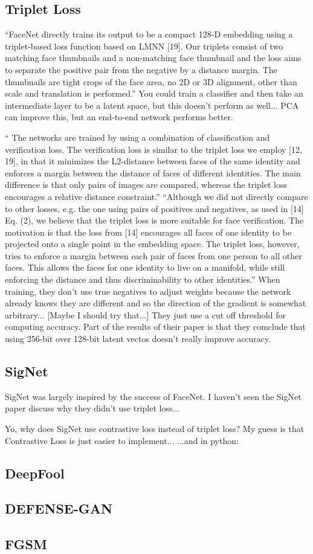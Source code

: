 \subsection{Triplet Loss}
``FaceNet directly trains
its output to be a compact 128-D embedding using a triplet-based loss function based on LMNN [19]. Our triplets consist of two matching face thumbnails and a non-matching
face thumbnail and the loss aims to separate the positive pair
from the negative by a distance margin. The thumbnails are
tight crops of the face area, no 2D or 3D alignment, other
than scale and translation is performed.''
You could train a classifier and then take an intermediate layer to be a latent space, but this doesn't perform as well...
PCA can improve this, but an end-to-end network performs better.
\cite{face_net}

`` The networks are trained by using a combination of classification and verification loss. The verification
loss is similar to the triplet loss we employ [12, 19], in that it
minimizes the L2-distance between faces of the same identity and enforces a margin between the distance of faces of
different identities. The main difference is that only pairs of
images are compared, whereas the triplet loss encourages a
relative distance constraint.''
``Although we did not directly compare to other losses,
e.g. the one using pairs of positives and negatives, as used
in [14] Eq. (2), we believe that the triplet loss is more suitable for face verification. The motivation is that the loss
from [14] encourages all faces of one identity to be projected onto a single point in the embedding space. The
triplet loss, however, tries to enforce a margin between each
pair of faces from one person to all other faces. This allows the faces for one identity to live on a manifold, while
still enforcing the distance and thus discriminability to other
identities.''
When training, they don't use true negatives to adjust weights because the network already knows they are different and so the direction of the gradient is somewhat arbitrary...
[Maybe I should try that...]
They just use a cut off threshold for computing accuracy.
Part of the results of their paper is that they comclude that using 256-bit over 128-bit latent vectos doesn't really improve accuracy.


\subsection{SigNet}
SigNet was largely inspired by the success of FaceNet.
I haven't seen the SigNet paper discuss why they didn't use triplet loss...

Yo, why does SigNet use contrastive loss instead of triplet loss?
    My guess is that Contrastive Loss is just easier to implement...
\cite{sig_net}
\cite{GitHub_sounakdey}
...and in python: \cite{GitHub_signet_pytorch}

\subsection{DeepFool}
\subsection{DEFENSE-GAN}

\subsection{FGSM}

